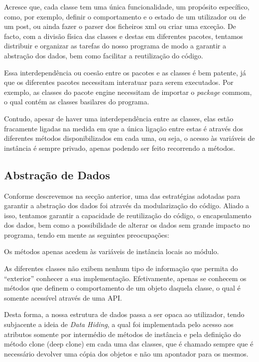 \documentclass[a4paper]{article}
\begin{document}
Acresce que, cada classe tem uma única funcionalidade, um propósito específico,
como, por exemplo, definir o comportamento e o estado de um utilizador ou de um
post, ou ainda fazer o parser dos ficheiros xml ou criar uma exceção.
De facto, com a divisão física das classes e destas em diferentes pacotes, tentamos
distribuir e organizar as tarefas do nosso programa de modo a garantir a
abstração dos dados, bem como facilitar a reutilização do código.

Essa interdependência ou coesão entre os pacotes e as classes é bem patente, já que
os diferentes pacotes necessitam interatuar para serem executados. Por exemplo,
as classes do pacote engine necessitam de importar o \textit{package} commom, o
qual contém as classes basilares do programa.


Contudo, apesar de haver uma interdependência entre as classes, elas estão
fracamente ligadas na medida em que a única ligação entre estas é através dos
diferentes métodos disponibilizados em cada uma, ou seja, o acesso às variáveis de
instância é sempre privado, apenas podendo ser feito recorrendo a métodos.






\subsection{Abstração de Dados}
\label{sec:abstracao}

Conforme descrevemos na secção anterior, uma das estratégias adotadas para garantir
a abstração dos dados foi através da modularização do código.
Aliado a isso, tentamos garantir a capacidade de reutilização do código, o encapsulamento
dos dados, bem como a possibilidade de alterar os dados sem grande impacto no programa,
tendo em mente as seguintes preocupações:
\begin{itemize}
\begin{item} Os métodos apenas acedem às variáveis de instância locais ao módulo.\end{item}
\begin{item} As diferentes classes não exibem nenhum tipo de informação que permita
do ``exterior'' conhecer a sua implementação. Efetivamente, apenas se conhecem os
métodos que definem o comportamento de um objeto daquela classe, o qual é somente
acessível através de uma API.\end{item}
\end{itemize}
Desta forma, a nossa estrutura de dados passa a ser opaca ao utilizador, tendo
subjacente a ideia de \textit{Data Hiding}, a qual foi implementada pelo acesso
aos atributos somente por intermédio de métodos de instância e pela definição do
método clone (deep clone) em cada uma das classes, que é chamado sempre que é
necessário devolver uma cópia dos objetos e não um apontador para os mesmos.
\end{document}

